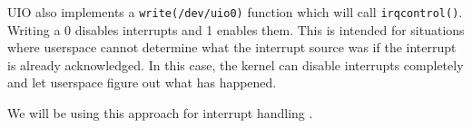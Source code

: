 \documentclass[../main.tex]{subfiles}
\begin{document}
    UIO also implements a \texttt{write(/dev/uio0)} function which will call \texttt{irqcontrol()}. Writing a 0 disables interrupts and 1 enables them. This is intended for situations where userspace cannot determine what the interrupt source was if the interrupt is already acknowledged. In this case, the kernel can disable interrupts completely and let userspace figure out what has happened.

    We will be using this approach for interrupt handling .
\end{document}
